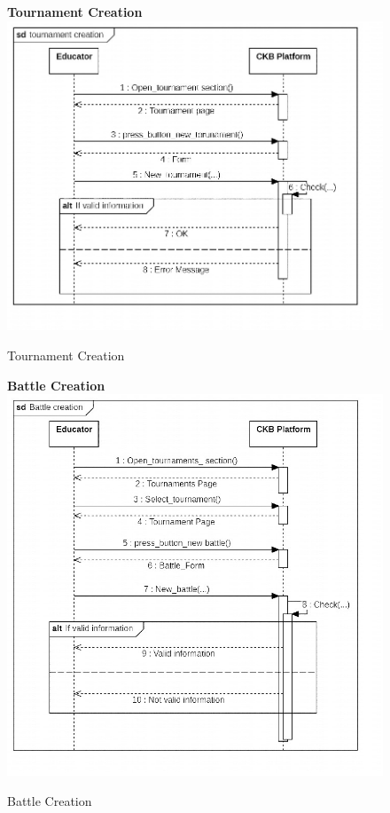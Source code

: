 \begin{enumerate}[label=\textbf{[UC\arabic*]}]
    \begin{figure}
    \item \textbf{Tournament Creation}
        \centering
        \includegraphics[width= \textwidth]{Images/Tournament creation.jpg}
        \caption{Tournament Creation}
        \label{fig:enter-label}
    \end{figure}
    
    
    \begin{figure}
    \item \textbf{Battle Creation}
        \centering
        \includegraphics[width= \textwidth]{Images/Battle creation.jpg}
        \caption{Battle Creation}
        \label{fig:enter-label}
    \end{figure}
    

\end{enumerate}
